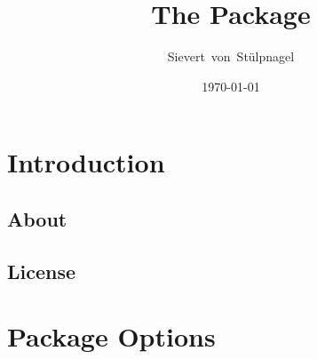 \documentclass{ltxdockit}
\title{The \sty{transconv} Package}
\author{Sievert\ von\ St\"{u}lpnagel}
\date{\today}
\begin{document}
\maketitle

\tableofcontents
\listoftables

\section{Introduction}\label{int}

\subsection[About]{About }

\subsection{License}

\section{Package Options}
\end{document}
